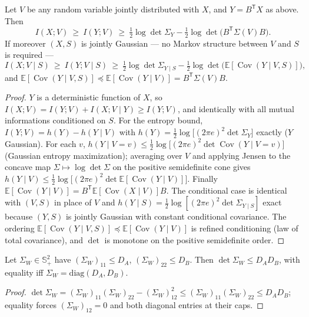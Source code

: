 \documentclass[11pt]{article}
\newcommand{\E}{\mathbb{E}}\newcommand{\tr}{\operatorname{tr}}
\newcommand{\Cov}{\operatorname{Cov}}\newcommand{\Var}{\operatorname{Var}}
\begin{document}
\begin{lemma}\label{lem:plane}
Let $V$ be any random variable jointly distributed with $X$, and
$Y=B^{\mathsf T}X$ as above. Then
\[
I(X;V)\ \ge\ I(Y;V)\ \ge\
\tfrac12\log\det\Sigma_Y-\tfrac12\log\det\bigl(B^{\mathsf T}\Sigma(V)B\bigr).
\]
If moreover $(X,S)$ is jointly Gaussian --- no Markov structure between $V$
and $S$ is required ---
\[
I(X;V\mid S)\ \ge\ I(Y;V\mid S)\ \ge\
\tfrac12\log\det\Sigma_{Y\mid S}
-\tfrac12\log\det\bigl(\E[\Cov(Y\mid V,S)]\bigr),
\]
and $\E[\Cov(Y\mid V,S)]\preceq \E[\Cov(Y\mid V)]=B^{\mathsf T}\Sigma(V)B$.
\end{lemma}
\begin{proof}
$Y$ is a deterministic function of $X$, so
$I(X;V)=I(Y;V)+I(X;V\mid Y)\ge I(Y;V)$, and identically with all mutual
informations conditioned on $S$. For the entropy bound,
$I(Y;V)=h(Y)-h(Y\mid V)$ with $h(Y)=\tfrac12\log\bigl[(2\pi
e)^2\det\Sigma_Y\bigr]$ exactly ($Y$ Gaussian). For each $v$,
$h(Y\mid V=v)\le\tfrac12\log\bigl[(2\pi e)^2\det\Cov(Y\mid V=v)\bigr]$
(Gaussian entropy maximization); averaging over $V$ and applying Jensen to
the concave map $\Sigma\mapsto\log\det\Sigma$ on the positive semidefinite
cone gives
$h(Y\mid V)\le\tfrac12\log\bigl[(2\pi e)^2\det\E[\Cov(Y\mid V)]\bigr]$.
Finally $\E[\Cov(Y\mid V)]=B^{\mathsf T}\E[\Cov(X\mid V)]B$. The conditional
case is identical with $(V,S)$ in place of $V$ and
$h(Y\mid S)=\tfrac12\log[(2\pi e)^2\det\Sigma_{Y\mid S}]$ exact because
$(Y,S)$ is jointly Gaussian with constant conditional covariance. The
ordering $\E[\Cov(Y\mid V,S)]\preceq\E[\Cov(Y\mid V)]$ is refined
conditioning (law of total covariance), and $\det$ is monotone on the
positive semidefinite order.
\end{proof}

\begin{lemma}\label{lem:hadamard}
Let $\Sigma_W\in\mathbb S^2_{+}$ have $(\Sigma_W)_{11}\le D_A$,
$(\Sigma_W)_{22}\le D_B$. Then $\det\Sigma_W\le D_A D_B$, with equality iff
$\Sigma_W=\mathrm{diag}(D_A,D_B)$.
\end{lemma}
\begin{proof}
$\det\Sigma_W=(\Sigma_W)_{11}(\Sigma_W)_{22}-(\Sigma_W)_{12}^2
\le(\Sigma_W)_{11}(\Sigma_W)_{22}\le D_AD_B$; equality forces
$(\Sigma_W)_{12}=0$ and both diagonal entries at their caps.
\end{proof}
\end{document}
